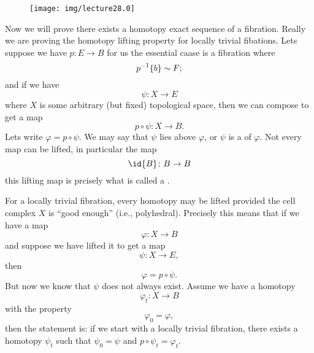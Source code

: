 

\begin{wrapfigure}{r}{10pc}
  \vspace{-20pt}
  \centering
  \texttt{[image: img/lecture28.0]}
\end{wrapfigure}
Now we will prove there exists a homotopy exact sequence of a
fibration. Really we are proving the homotopy lifting property
for locally trivial fibations. Lets suppose we have $p\colon E\to
B$ for us the essential caase is a fibration where
\begin{equation*}
p^{-1}\{b\}\sim F;
\end{equation*}
and if we have
\begin{equation*}
\psi\colon X\to E
\end{equation*}
where $X$ is some arbitrary (but fixed) topological space, then
we can compose to get a map 
\begin{equation*}
p\circ\psi\colon X\to B.
\end{equation*}
Lets write $\varphi=p\circ\psi$. We may say that $\psi$ lies
above $\varphi$, or $\psi$ is a 
of $\varphi$. Not every map can be lifted, in particular the map
\begin{equation}
\id{B}\colon B\to B
\end{equation}
this lifting map is prcisely what is called a
.

For a locally trivial fibration, every homotopy may be lifted
provided the cell complex $X$ is ``good enough'' (i.e.,
polyhedral). Precisely this means that if we have a map
\begin{equation}
\varphi\colon X\to B
\end{equation}
and suppose we have lifted it to get a map
\begin{equation}
\psi\colon X\to E,
\end{equation}
then
\begin{equation}
\varphi=p\circ\psi.
\end{equation}
But now we know that $\psi$ does not always exist. Assume we have
a homotopy 
\begin{equation}
\varphi_{t}\colon X\to B
\end{equation}
with the property
\begin{equation}
\varphi_0=\varphi,
\end{equation}
then the statement is: if we start with a locally trivial
fibration, there exists a homotopy $\psi_t$ such that
$\psi_0=\psi$ and $p\circ\psi_t=\varphi_t$.

